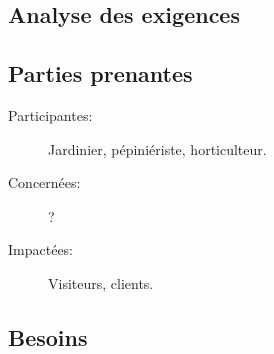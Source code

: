 \textcolor[RGB]{46, 116, 181}{\chapter{Analyse des exigences}}
\section{Parties prenantes}
\begin{description}
\item[Participantes:] Jardinier, pépiniériste, horticulteur.
\item[Concernées:] ?
\item[Impactées:] Visiteurs, clients.
\end{description}

\section{Besoins}
